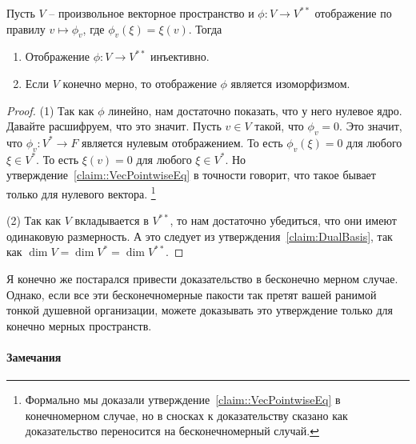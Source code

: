 \begin{claim}
\label{claim::DoubleDuoIsom}
Пусть $V$ -- произвольное векторное пространство и $\phi\colon V\to V^{**}$ отображение по правилу $v\mapsto \phi_v$, где $\phi_v(\xi) = \xi(v)$.
Тогда 
\begin{enumerate}
\item Отображение $\phi\colon V\to V^{**}$ инъективно.

\item Если $V$ конечно мерно, то отображение $\phi$ является изоморфизмом.
\end{enumerate}
\end{claim}
\begin{proof}
(1) Так как $\phi$ линейно, нам достаточно показать, что у него нулевое ядро.
Давайте расшифруем, что это значит.
Пусть $v\in V$ такой, что $\phi_v = 0$.
Это значит, что $\phi_v \colon V^* \to F$ является нулевым отображением.
То есть $\phi_v(\xi) = 0$ для любого $\xi \in V^*$.
То есть $\xi(v) = 0$ для любого $\xi \in V^*$.
Но утверждение~\ref{claim::VecPointwiseEq} в точности говорит, что такое бывает только для нулевого вектора.%
\footnote{Формально мы доказали утверждение~\ref{claim::VecPointwiseEq} в конечномерном случае, но в сносках к доказательству сказано как доказательство переносится на бесконечномерный случай.}

(2) Так как $V$ вкладывается в $V^{**}$, то нам достаточно убедиться, что они имеют одинаковую размерность.
А это следует из утверждения~\ref{claim:DualBasis}, так как $\dim V = \dim V^* = \dim V^{**}$.
\end{proof}

Я конечно же постарался привести доказательство в бесконечно мерном случае.
Однако, если все эти бесконечномерные пакости так претят вашей ранимой тонкой душевной организации, можете доказывать это утверждение только для конечно мерных пространств.

\paragraph{Замечания}

